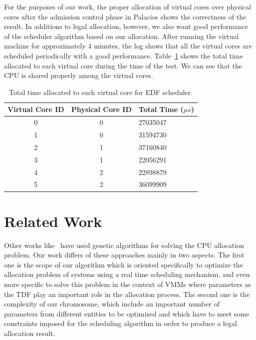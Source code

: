\documentclass[11pt]{article}
\begin{document}
For the purposes of our work, the proper allocation of virtual cores over physical cores after the admission control phase in Palacios shows the correctness of the result. In additions to legal allocation, however, we also want good performance of the scheduler algorithm based on our allocation. After running the virtual machine for approximately 4 minutes, the log shows that all the virtual cores are scheduled periodically with a good performance. Table~\ref{tab:table2} shows the total time allocated to each virtual core during the time of the test. We can see that the CPU is shared properly among the virtual cores.

\begin{table}[H]
\centering
\renewcommand{\arraystretch}{1.2}

 \begin{tabularx}{275pt}{ | c | c | X | }
 \hline
Virtual Core ID & Physical Core ID & Total Time ($\mu$$s$) \\ \hline

0 & 0 & 27035047 \\ \hline

1 & 0 & 31594730 \\ \hline

2 & 1 & 37160840 \\ \hline

3 & 1 & 22056291 \\ \hline

4 & 2 & 22898879 \\ \hline

5 & 2 & 36099909 \\ \hline

\end{tabularx}
\caption{Total time allocated to each virtual core for EDF scheduler.}
 \label{tab:table2}
\end{table}

\section{Related Work}

Other works like~\cite{Shahid94,Wu04anincremental,Omara2010} have used genetic algorithms for solving the CPU allocation problem. Our work differs of these approaches mainly in two aspects. The first one is the scope of our algorithm which is oriented specifically to optimize the allocation problem of systems 
using a real time scheduling mechanism, and even more specific to solve this problem in the context of VMMs where parameters as the TDF play an important role in the allocation process. The second one is the complexity of our chromosome, which include an important number of parameters from different entities to be optimized and which have to meet some constraints imposed for the scheduling algorithm in order to produce a legal allocation result.
\end{document}

